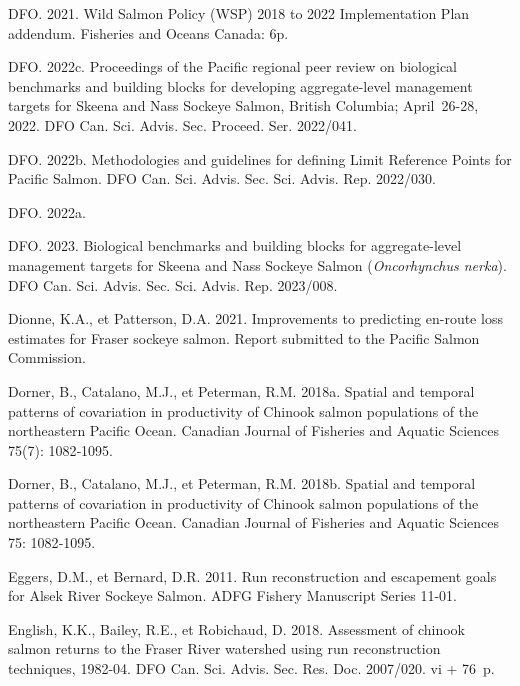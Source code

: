 \documentclass[french,11pt]{book}
\begin{document}
\begin{CSLReferences}{1}{0}
DFO. 2021. {Wild Salmon Policy (WSP) 2018 to 2022 Implementation Plan addendum}. {Fisheries and Oceans Canada}: 6p.

DFO. 2022c. {Proceedings of the Pacific regional peer review on biological benchmarks and building blocks for developing aggregate-level management targets for Skeena and Nass Sockeye Salmon, British Columbia; April~26-28, 2022}. DFO Can. Sci. Advis. Sec. Proceed. Ser. 2022/041.

DFO. 2022b. {Methodologies and guidelines for defining Limit Reference Points for Pacific Salmon}. DFO Can. Sci. Advis. Sec. Sci. Advis. Rep. 2022/030.

DFO. 2022a.

DFO. 2023. {Biological benchmarks and building blocks for aggregate-level management targets for Skeena and Nass Sockeye Salmon (}\emph{Oncorhynchus nerka}{)}. DFO Can. Sci. Advis. Sec. Sci. Advis. Rep. 2023/008.

Dionne, K.A., et Patterson, D.A. 2021. Improvements to predicting en-route loss estimates for Fraser sockeye salmon. Report submitted to the Pacific Salmon Commission.

Dorner, B., Catalano, M.J., et Peterman, R.M. 2018a. {Spatial and temporal patterns of covariation in productivity of Chinook salmon populations of the northeastern Pacific Ocean}. Canadian Journal of Fisheries and Aquatic Sciences 75(7): 1082‑1095.

Dorner, B., Catalano, M.J., et Peterman, R.M. 2018b. Spatial and temporal patterns of covariation in productivity of Chinook salmon populations of the northeastern Pacific Ocean. Canadian Journal of Fisheries and Aquatic Sciences 75: 1082‑1095.

Eggers, D.M., et Bernard, D.R. 2011. {Run reconstruction and escapement goals for Alsek River Sockeye Salmon}. ADFG Fishery Manuscript Series 11-01.

English, K.K., Bailey, R.E., et Robichaud, D. 2018. {Assessment of chinook salmon returns to the Fraser River watershed using run reconstruction techniques, 1982-04}. DFO Can. Sci. Advis. Sec. Res. Doc. 2007/020. vi + 76~p.


\end{CSLReferences}
\end{document}

